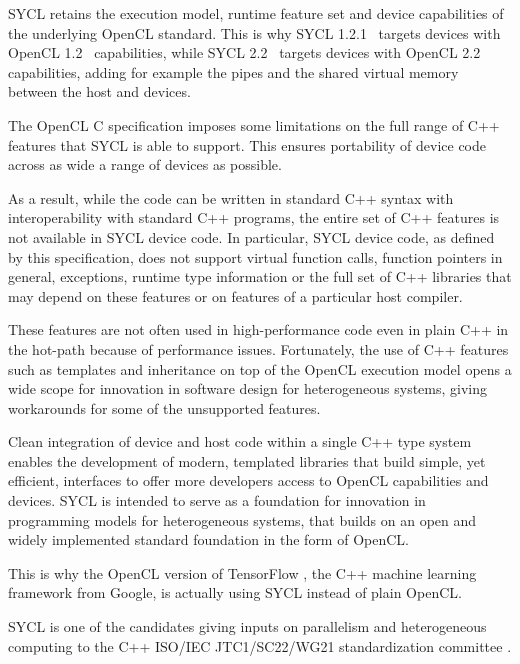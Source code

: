 \documentclass[sigplan, review, authordraft]{acmart}
\begin{document}
SYCL retains the execution model, runtime feature set and device
capabilities of the underlying OpenCL standard. This is why SYCL
1.2.1~\cite{SYCL-1.2.1} targets devices with OpenCL
1.2~\cite{OpenCL-API+C-1.2} capabilities, while SYCL
2.2~\cite{SYCL-2.2-provisional} targets devices with OpenCL
2.2~\cite{OpenCL-API-2.2-provisional} capabilities, adding for example
the pipes and the shared virtual memory between the host and devices.

The OpenCL C specification imposes some limitations on the full range
of C++ features that SYCL is able to support. This ensures portability
of device code across as wide a range of devices as possible.

As a result, while the code can be written in standard C++ syntax with
interoperability with standard C++ programs, the entire set of C++
features is not available in SYCL device code. In particular, SYCL
device code, as defined by this specification, does not support
virtual function calls, function pointers in general, exceptions,
runtime type information or the full set of C++ libraries that may
depend on these features or on features of a particular host compiler.

These features are not often used in high-performance code even
in plain C++ in the hot-path because of performance issues.
Fortunately, the use of C++ features such as templates and inheritance
on top of the OpenCL execution model opens a wide scope for innovation
in software design for heterogeneous systems, giving workarounds for
some of the unsupported features.

Clean integration of device and host code within a single C++ type
system enables the development of modern, templated libraries that
build simple, yet efficient, interfaces to offer more developers
access to OpenCL capabilities and devices. SYCL is intended to serve
as a foundation for innovation in programming models for heterogeneous
systems, that builds on an open and widely implemented standard
foundation in the form of OpenCL.

This is why the OpenCL version of TensorFlow \cite{TensorFlow-1.0},
the C++ machine learning framework from Google, is actually using SYCL
instead of plain OpenCL.

SYCL is one of the candidates giving inputs on parallelism and
heterogeneous computing to the C++ ISO/IEC JTC1/SC22/WG21
standardization committee
\cite{C++:P00236R0:SYCL,C++:P0362R0,C++:P0363R0,C++:P0367R0}.

\end{document}
